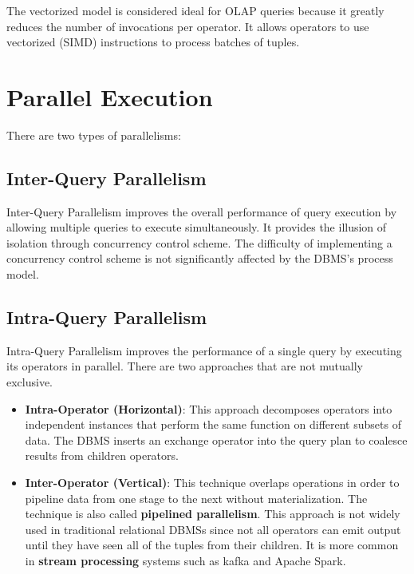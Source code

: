 \documentclass[11pt]{article}
\begin{document}
The vectorized model is considered ideal for OLAP queries because it greatly reduces the number of 
invocations per operator. It allows operators to use vectorized (SIMD) instructions to process 
batches of tuples.


\section{Parallel Execution}
There are two types of parallelisms:
\subsection*{Inter-Query Parallelism}
Inter-Query Parallelism improves the overall performance of query execution by allowing multiple 
queries to execute simultaneously. It provides the illusion of isolation through concurrency 
control scheme. The difficulty of implementing a concurrency control scheme is not significantly 
affected by the DBMS’s process model.

\subsection*{Intra-Query Parallelism}
Intra-Query Parallelism improves the performance of a single query by executing its operators in 
parallel. There are two approaches that are not mutually exclusive. 
\begin{itemize}
    \item \textbf{Intra-Operator (Horizontal)}:
    This approach decomposes operators into independent instances that perform the same function on 
    different subsets of data. The DBMS inserts an exchange operator into the query plan to 
    coalesce results from children operators.
    \item \textbf{Inter-Operator (Vertical)}:
    This technique overlaps operations in order to pipeline data from one stage to the next without 
    materialization. The technique is also called \textbf{pipelined parallelism}. This approach is 
    not widely used in traditional relational DBMSs since not all operators can emit output until 
    they have seen all of the tuples from their children. It is more common 
    in \textbf{stream processing} systems such as kafka and Apache Spark.
\end{itemize}
\end{document}
